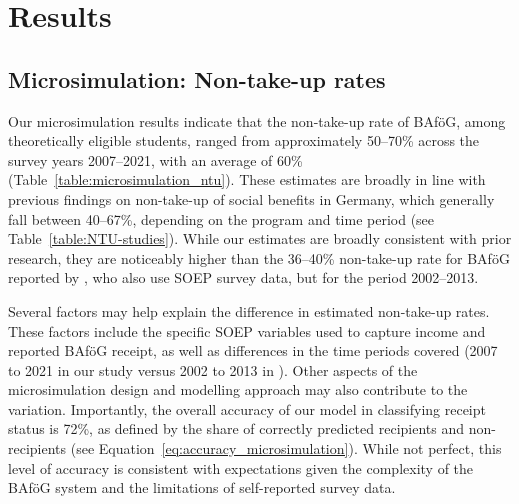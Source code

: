 %
%

\section{Results}


\subsection{Microsimulation: Non-take-up rates}

Our microsimulation results indicate that the non-take-up rate of BAföG, among theoretically eligible students, ranged from approximately 50--70\% across the survey years 2007--2021, with an average of 60\% (Table~\ref{table:microsimulation_ntu}). These estimates are broadly in line with previous findings on non-take-up of social benefits in Germany, which generally fall between 40--67\%, depending on the program and time period (see Table~\ref{table:NTU-studies}). While our estimates are broadly consistent with prior research, they are noticeably higher than the 36--40\% non-take-up rate for BAföG reported by \cite{herber_non-take-up_2019}, who also use SOEP survey data, but for the period 2002--2013.

Several factors may help explain the difference in estimated non-take-up rates. These factors include the specific SOEP variables used to capture income and reported BAföG receipt, as well as differences in the time periods covered (2007 to 2021 in our study versus 2002 to 2013 in \cite{herber_non-take-up_2019}). Other aspects of the microsimulation design and modelling approach may also contribute to the variation. Importantly, the overall accuracy of our model in classifying receipt status is 72\%, as defined by the share of correctly predicted recipients and non-recipients (see Equation~\ref{eq:accuracy_microsimulation}). While not perfect, this level of accuracy is consistent with expectations given the complexity of the BAföG system and the limitations of self-reported survey data.


